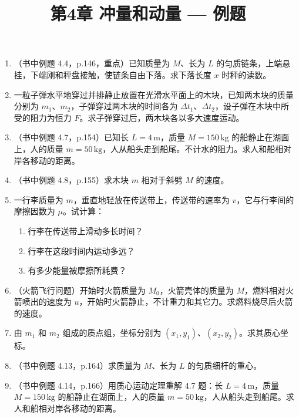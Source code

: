 \documentclass{ctexart}
\title{\textbf{第4章 冲量和动量} --- 例题}
\author{}
\date{}
\begin{document}
\maketitle

\begin{enumerate}

\item（书中例题 4.4，p.146，重点）已知质量为 $M$、长为 $L$ 的匀质链条，上端悬挂，下端刚和秤盘接触，使链条自由下落。求下落长度 $x$ 时秤的读数。

\item 一粒子弹水平地穿过并排静止放置在光滑水平面上的木块，已知两木块的质量分别为 $m_1$、$m_2$，子弹穿过两木块的时间各为 $\Delta t_1$、$\Delta t_2$，设子弹在木块中所受的阻力为恒力 $F$。求子弹穿过后，两木块各以多大速度运动。

\item（书中例题 4.7，p.154）已知长 $L = 4\,\text{m}$，质量 $M = 150\,\text{kg}$ 的船静止在湖面上，人的质量 $m = 50\,\text{kg}$，人从船头走到船尾。不计水的阻力。求人和船相对岸各移动的距离。

\item（书中例题 4.8，p.155）求木块 $m$ 相对于斜劈 $M$ 的速度。

\item 一行李质量为 $m$，垂直地轻放在传送带上，传送带的速率为 $v$，它与行李间的摩擦因数为 $\mu$。试计算：
\begin{enumerate}
  \item 行李在传送带上滑动多长时间？
  \item 行李在这段时间内运动多远？
  \item 有多少能量被摩擦所耗费？
\end{enumerate}

\item（火箭飞行问题）开始时火箭质量为 $M_0$，火箭壳体的质量为 $M$，燃料相对火箭喷出的速度为 $u$，开始时火箭静止，不计重力和其它力。求燃料烧尽后火箭的速度。

\item 由 $m_1$ 和 $m_2$ 组成的质点组，坐标分别为 $(x_1, y_1)$、$(x_2, y_2)$。求其质心坐标。

\item（书中例题 4.13，p.164）求质量为 $M$、长为 $L$ 的匀质细杆的重心。

\item（书中例题 4.14，p.166）用质心运动定理重解 4.7 题：长 $L = 4\,\text{m}$，质量 $M = 150\,\text{kg}$ 的船静止在湖面上，人的质量 $m = 50\,\text{kg}$，人从船头走到船尾。求人和船相对岸各移动的距离。

\end{enumerate}
\end{document}
